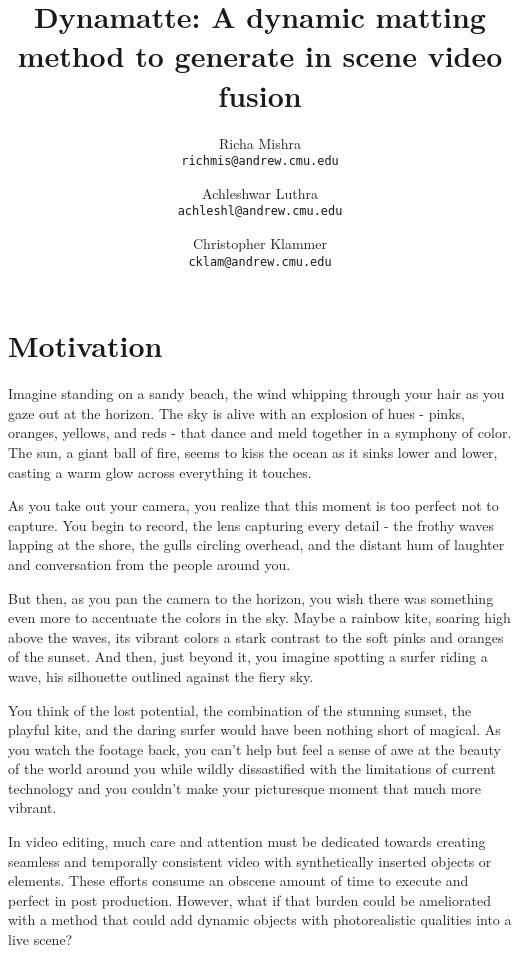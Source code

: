 \documentclass{article}
\title{Dynamatte: A dynamic matting method to generate in scene video fusion}
\author{Richa Mishra \\
\small\texttt{richmis@andrew.cmu.edu}
\and
Achleshwar Luthra \\
\small\texttt{achleshl@andrew.cmu.edu}
\and
Christopher Klammer \\
\small\texttt{cklam@andrew.cmu.edu}}
\begin{document}
\maketitle


\section{Motivation}

Imagine standing on a sandy beach, the wind whipping through your hair as you gaze out at the horizon. The sky is alive with an explosion of hues - pinks, oranges, yellows, and reds - that dance and meld together in a symphony of color. The sun, a giant ball of fire, seems to kiss the ocean as it sinks lower and lower, casting a warm glow across everything it touches.

As you take out your camera, you realize that this moment is too perfect not to capture. You begin to record, the lens capturing every detail - the frothy waves lapping at the shore, the gulls circling overhead, and the distant hum of laughter and conversation from the people around you.

But then, as you pan the camera to the horizon, you wish there was something even more to accentuate the colors in the sky. Maybe a rainbow kite, soaring high above the waves, its vibrant colors a stark contrast to the soft pinks and oranges of the sunset. And then, just beyond it, you imagine spotting a surfer riding a wave, his silhouette outlined against the fiery sky.

You think of the lost potential, the combination of the stunning sunset, the playful kite, and the daring surfer would have been nothing short of magical. As you watch the footage back, you can't help but feel a sense of awe at the beauty of the world around you while wildly dissastified with the limitations of current technology and you couldn't make your picturesque moment that much more vibrant. 

In video editing, much care and attention must be dedicated towards creating seamless and temporally consistent video with synthetically inserted objects or elements. These efforts consume an obscene amount of time to execute and perfect in post production. However, what if that burden could be ameliorated with a method that could add dynamic objects with photorealistic qualities into a live scene? 
\end{document}
